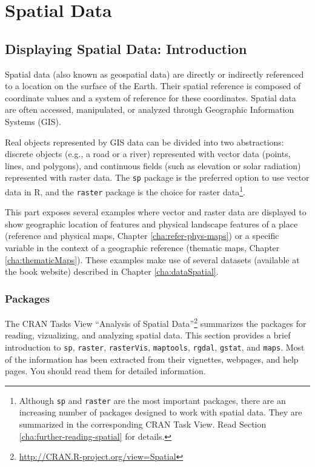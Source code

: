\part{Spatial Data}
\label{cha:Spatial}

\chapter{Displaying Spatial Data: Introduction}
\label{cha:spatialIntro}

Spatial data (also known as geospatial data) are directly or
indirectly referenced to a location on the surface of the Earth. Their
spatial reference is composed of coordinate values and a system of
reference for these coordinates. Spatial data are often accessed,
manipulated, or analyzed through Geographic Information Systems (GIS).

Real objects represented by GIS data can be divided into two
abstractions: discrete objects (e.g., a road or a river)
represented with vector data (points, lines, and polygons), and
continuous fields (such as elevation or solar radiation)
represented with raster data. The \texttt{sp} package is the
preferred option to use vector data in \textsf{R}, and the
\texttt{raster} package is the choice for raster
data\footnote{Although \texttt{sp} and \texttt{raster} are the
  most important packages, there are an increasing number of
  packages designed to work with spatial data. They are summarized
  in the corresponding CRAN Task View. Read Section
  \ref{cha:further-reading-spatial} for details.}.

This part exposes several examples where vector and raster data
are displayed to show geographic location of features and physical
landscape features of a place (reference and physical maps,
Chapter \ref{cha:refer-phys-maps}) or a specific variable in the
context of a geographic reference (thematic maps, Chapter
\ref{cha:thematicMaps}). These examples make use of several datasets
(available at the book website) described in Chapter
\ref{cha:dataSpatial}.


\section{Packages}
\label{sec:spatial-packages}

The CRAN Tasks View ``Analysis of Spatial
Data''\footnote{\url{http://CRAN.R-project.org/view=Spatial}}
summarizes the packages for reading, vizualizing, and analyzing
spatial data. This section provides a brief introduction to
\texttt{sp}, \texttt{raster}, \texttt{rasterVis}, \texttt{maptools},
\texttt{rgdal}, \texttt{gstat}, and \texttt{maps}. Most of the
information has been extracted from their vignettes, webpages, and help
pages. You should read them for detailed information.

